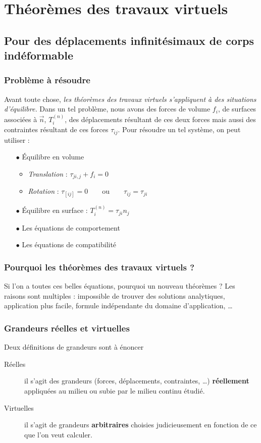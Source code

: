 \chapter{Théorèmes des travaux virtuels}
\section{Pour des déplacements infinitésimaux de corps indéformable}
	\subsection{Problème à résoudre}
	Avant toute chose, \textit{les théorèmes des travaux virtuels s'appliquent
	à des situations d'équilibre.} Dans un tel problème, nous avons des forces 
	de volume $f_i$, de surfaces associées à $\vec{n}$, $T_i^{(n)}$, des 
	déplacements résultant de ces deux forces mais aussi des contraintes 
	résultant de ces forces $\tau_{ij}$. Pour résoudre un tel système, on peut 
	utiliser :
	\begin{itemize}
	\item[$\bullet$] Équilibre en volume
		\begin{itemize}
		\item \textit{Translation} : $\tau_{ji,j}+f_i = 0$
		\item \textit{Rotation} : $\tau_{[ij]} =0\qquad\text{ou}\qquad \tau_{ij}=
		\tau_{ji}$
		\end{itemize}
	\item[$\bullet$] Équilibre en surface : $T_i^{(n)} = \tau_{ji}n_j$
	\item[$\bullet$] Les équations de comportement
	\item[$\bullet$] Les équations de compatibilité
	\end{itemize}

	\subsection{Pourquoi les théorèmes des travaux virtuels ?}
	Si l'on a toutes ces belles équations, pourquoi un nouveau théorèmes ? Les 
	raisons sont multiples : impossible de trouver des solutions analytiques, 
	application plus facile, formule indépendante du domaine d'application, 
	\dots
	
	\subsection{Grandeurs réelles et virtuelles}
	Deux définitions de grandeurs sont à énoncer 
	\begin{description}
	\item[Réelles] il s'agit des grandeurs (forces, déplacements, contraintes, 
	\dots) \textbf{réellement} appliquées au milieu ou subie par le milieu 
	continu étudié.
	\item[Virtuelles] il s'agit de grandeurs \textbf{arbitraires} choisies 
	judicieusement en fonction de ce que l'on veut calculer.
	\end{description}
	
